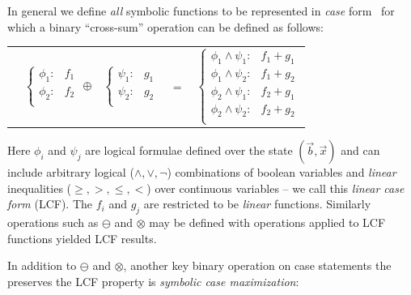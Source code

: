 \documentclass[letterpaper]{article}
\begin{document}
In general we define \emph{all} symbolic functions to be represented
in \emph{case} form~\cite{fomdp} for which a binary ``cross-sum'' operation
can be defined as follows:
\begin{center}
\begin{tabular}{r c c c l}
&
\hspace{-6mm} 
  $\begin{cases}
    \phi_1: & f_1 \\ 
    \phi_2: & f_2 \\ 
  \end{cases}$
$\oplus$
&
\hspace{-4mm}
  $\begin{cases}
    \psi_1: & g_1 \\ 
    \psi_2: & g_2 \\ 
  \end{cases}$
&
\hspace{-2mm} 
$ = $
&
\hspace{-2mm}
  $\begin{cases}
  \phi_1 \wedge \psi_1: & f_1 + g_1 \\ 
  \phi_1 \wedge \psi_2: & f_1 + g_2 \\ 
  \phi_2 \wedge \psi_1: & f_2 + g_1 \\ 
  \phi_2 \wedge \psi_2: & f_2 + g_2 \\ 
  \end{cases}$
\end{tabular}
\end{center}
Here $\phi_i$ and $\psi_j$ are logical formulae defined over the state
$(\vec{b},\vec{x})$ and can include arbitrary logical
($\land,\lor,\neg$) combinations of boolean variables
and \emph{linear} inequalities ($\geq,>,\leq,<$) over continuous
variables -- we call this \emph{linear case form} (LCF).  The $f_i$
and $g_j$ are restricted to be \emph{linear} functions.  Similarly
operations such as $\ominus$ and $\otimes$ may be defined with operations
applied to LCF functions yielded LCF results.

In addition to $\ominus$ and $\otimes$, another key binary operation on case
statements the preserves the LCF property is \emph{symbolic case maximization}:
\end{document}
